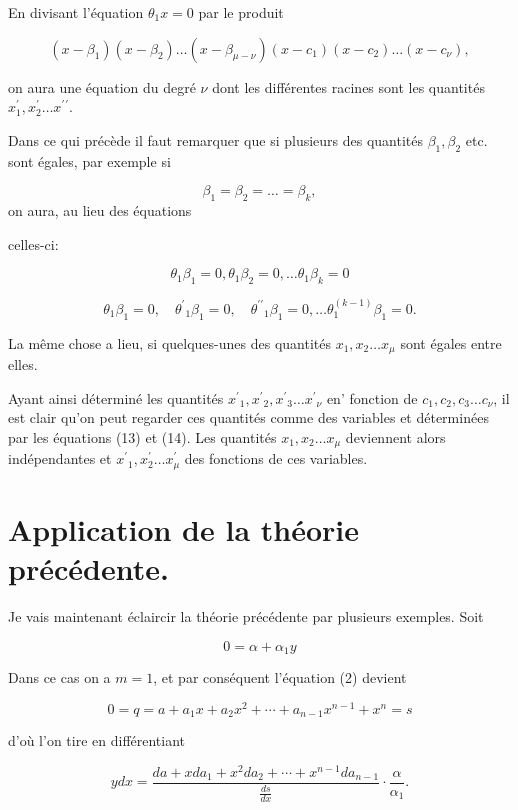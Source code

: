 \documentclass{article}
\begin{document}
En divisant l'équation \(\theta_{1} x=0\) par le produit

\[
\left(x-\beta_{1}\right)\left(x-\beta_{2}\right) \ldots\left(x-\beta_{\mu-\nu}\right)\left(x-c_{1}\right)\left(x-c_{2}\right) \ldots\left(x-c_{\nu}\right),
\]

on aura une équation du degré \(\nu\) dont les différentes racines sont les quantités \(x_{1}^{\prime}, x_{2}^{\prime} \ldots x^{\prime}{ }^{\prime}\).

Dans ce qui précède il faut remarquer que si plusieurs des quantités \(\beta_{1}, \beta_{2}\) etc. sont égales, par exemple si

\[
\beta_{1}=\beta_{2}=\ldots=\beta_{k},
\]
on aura, au lieu des équations

celles-ci:

\[
\theta_{1} \beta_{1}=0, \theta_{1} \beta_{2}=0, \ldots \theta_{1} \beta_{k}=0
\]

\[
\theta_{1} \beta_{1}=0, \quad \theta^{\prime}{ }_{1} \beta_{1}=0, \quad \theta^{\prime \prime}{ }_{1} \beta_{1}=0, \ldots \theta_{1}^{(k-1)} \beta_{1}=0 .
\]

La même chose a lieu, si quelques-unes des quantités \(x_{1}, x_{2} \ldots x_{\mu}\) sont égales entre elles.

Ayant ainsi déterminé les quantités \(x^{\prime}{ }_{1}, x^{\prime}{ }_{2}, x^{\prime}{ }_{3} \ldots x^{\prime}{ }_{\nu}\) en' fonction de \(c_{1}, c_{2}, c_{3} \ldots c_{\nu}\), il est clair qu'on peut regarder ces quantités comme des variables et déterminées par les équations (13) et (14). Les quantités \(x_{1}, x_{2} \ldots x_{\mu}\) deviennent alors indépendantes et \(x^{\prime}{ }_{1}, x_{2}^{\prime} \ldots x_{\mu}^{\prime}\) des fonctions de ces variables.

\section*{Application de la théorie précédente.}

Je vais maintenant éclaircir la théorie précédente par plusieurs exemples. Soit

\[
0=\alpha+\alpha_{1} y
\]

Dans ce cas on a \(m=1\), et par conséquent l'équation (2) devient

\[
0=q=a+a_{1} x+a_{2} x^{2}+\cdots+a_{n-1} x^{n-1}+x^{n}=s
\]

d'où l'on tire en différentiant

\[
y d x=\frac{d a+x d a_{1}+x^{2} d a_{2}+\cdots+x^{n-1} d a_{n-1}}{\frac{d s}{d x}} \cdot \frac{\alpha}{\alpha_{1}} .
\]
\end{document}
